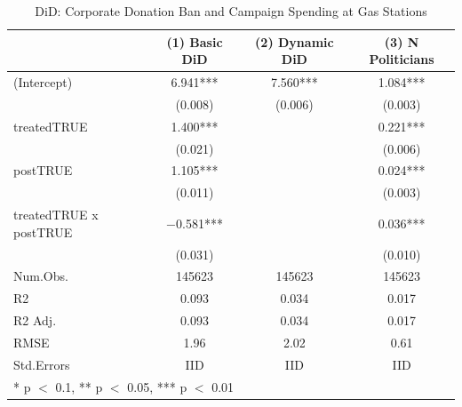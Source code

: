 \begin{table}
\centering
\caption{DiD: Corporate Donation Ban and Campaign Spending at Gas Stations}
\centering
\begin{tabular}[t]{lccc}
\toprule
  & (1) Basic DiD & (2) Dynamic DiD & (3) N Politicians\\
\midrule
(Intercept) & \num{6.941}*** & \num{7.560}*** & \num{1.084}***\\
 & (\num{0.008}) & (\num{0.006}) & (\num{0.003})\\
treatedTRUE & \num{1.400}*** &  & \num{0.221}***\\
 & (\num{0.021}) &  & (\num{0.006})\\
postTRUE & \num{1.105}*** &  & \num{0.024}***\\
 & (\num{0.011}) &  & (\num{0.003})\\
treatedTRUE x postTRUE & \num{-0.581}*** &  & \num{0.036}***\\
 & (\num{0.031}) &  & (\num{0.010})\\
\midrule
Num.Obs. & \num{145623} & \num{145623} & \num{145623}\\
R2 & \num{0.093} & \num{0.034} & \num{0.017}\\
R2 Adj. & \num{0.093} & \num{0.034} & \num{0.017}\\
RMSE & \num{1.96} & \num{2.02} & \num{0.61}\\
Std.Errors & IID & IID & IID\\
\bottomrule
\multicolumn{4}{l}{\rule{0pt}{1em}* p $<$ 0.1, ** p $<$ 0.05, *** p $<$ 0.01}\\
\end{tabular}
\end{table}

